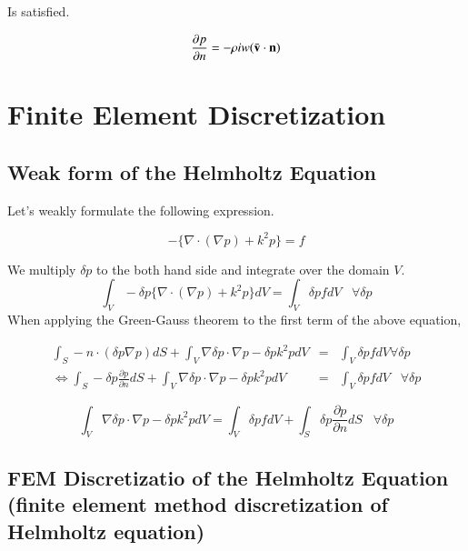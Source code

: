 Is satisfied.

\begin{equation}
\frac{\partial p}{\partial n} = -\rho iw(\bar{\mathbf{v}}\cdot\mathbf{n})
\end{equation}




\section{Finite Element Discretization}

\subsection{Weak form of the Helmholtz Equation}

Let's weakly formulate the following expression.

\begin{equation}
 -\{\nabla\cdot(\nabla p)+k^2 p\} = f
\end{equation}

We multiply $\delta p$ to the both hand side and integrate over the domain $V$.
%
\begin{equation}
\int_V -\delta p \{\nabla\cdot(\nabla p) + k^2 p \} dV = \int_V \delta p f dV\;\;\;\forall \delta p
\end{equation}
%
When applying the Green-Gauss theorem to the first term of the above equation,

\begin{eqnarray}
\int_S -n\cdot (\delta p\nabla p) dS + \int_V \nabla\delta p \cdot\nabla p -  \delta p k^2 p  dV &=& \int_V \delta p f dV\forall \delta p\\
\Leftrightarrow \int_S -\delta p\frac{\partial p}{\partial n} dS + \int_V \nabla\delta p \cdot\nabla p -  \delta p k^2 p  dV &=& \int_V \delta p f dV\;\;\;\forall \delta p
\end{eqnarray}

\begin{tcolorbox}[title=Weak Formulation of the Helmholtz Equation]
\begin{equation}
\int_V \nabla\delta p \cdot\nabla p - \delta p k^2 p  dV = \int_V \delta p f dV + \int_S \delta p\frac{\partial p}{\partial n} dS \;\;\;\forall \delta p
\end{equation}
\end{tcolorbox}


\subsection{FEM Discretizatio of the Helmholtz Equation (finite element method discretization of Helmholtz equation)}

